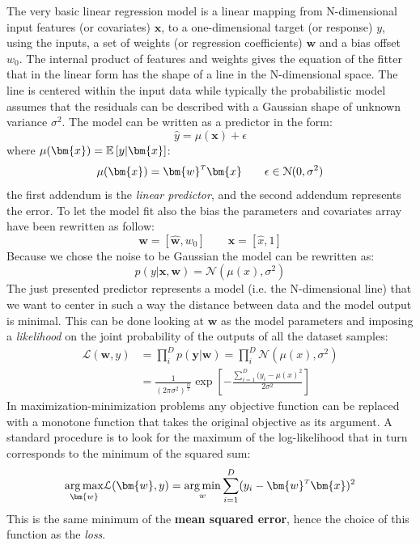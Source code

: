 The very basic linear regression model is a linear mapping from N-dimensional input features (or covariates) $\bm{x}$, to a one-dimensional target (or response) $y$, using the inputs, a set of weights (or regression coefficients) $\bm{w}$ and a bias offset $w_0$. The internal product of features and weights gives the equation of the fitter that in the linear form has the shape of a line in the N-dimensional space. The line is centered within the input data while typically the probabilistic model assumes that the residuals can be described with a Gaussian shape of unknown variance $\sigma^2$. The model can be written as a predictor in the form:
\begin{equation}
    \hat{y} = \mu(\bm{x}) + \epsilon
\end{equation}
where $\mu(\bm{x}) = \expectation{y|\bm{x}}$:
\begin{equation}
     \mu(\bm{x}) = \transpose{\bm{w}}\bm{x} \qquad  \epsilon \in \mathcal{N}(0,\sigma^2)
\end{equation}
the first addendum is the \textit{linear predictor}, and the second addendum represents the error. To let the model fit also the bias the parameters and covariates array have been rewritten as follow:
\begin{equation}
    \bm{w} = [\hat{\bm{w}},w_0] \qquad \bm{x} = [\hat{x}, 1]
\end{equation}
Because we chose the noise to be Gaussian the model can be rewritten as:
\begin{equation}
    p(y|\bm{x},\bm{w}) = \mathcal{N}(\mu(x), \sigma^2)
\end{equation}
The just presented predictor represents a model (i.e. the N-dimensional line) that we want to center in such a way the distance between data and the model output is minimal.
This can be done looking at $\bm{w}$ as the model parameters and imposing a \textit{likelihood} on the joint probability of the outputs of all the dataset samples:
\begin{align}
    \mathcal{L}(\bm{w}, y) &= \prod_i^D p(\bm{y}|\bm{w}) = \prod_i^D \mathcal{N}(\mu(x),\sigma^2) \\
    &= \frac{1}{(2\pi \sigma^2)^{\frac{D}{2}}} \exp \left[  -\frac{\sum_{i=1}^D (y_i-\mu(x)^2}{2\sigma^2} \right]
\end{align}
In maximization-minimization problems any objective function can be replaced with a monotone function that takes the original objective as its argument. A standard procedure is to look for the maximum of the log-likelihood that in turn corresponds to the minimum of the squared sum:
\begin{equation}
    \argmax{\bm{w}} \mathcal{L}(\bm{w},y) = \argmin{w} \sum_{i=1}^D (y_i - \transpose{\bm{w}}\bm{x})^2
\end{equation}
This is the same minimum of the \textbf{mean squared error}, hence the choice of this function as the \textit{loss}.

